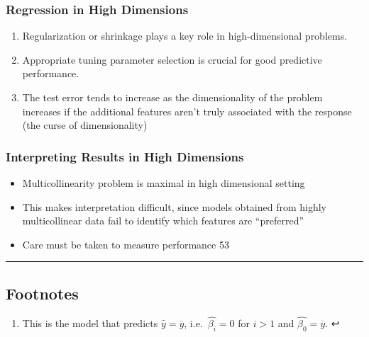 \documentclass[11pt]{article}
\providecommand{\tightlist}{%
      \setlength{\itemsep}{0pt}\setlength{\parskip}{0pt}}
\begin{document}
    \hypertarget{regression-in-high-dimensions}{%
\subsubsection{Regression in High
Dimensions}\label{regression-in-high-dimensions}}

    \begin{enumerate}
\def\labelenumi{\arabic{enumi}.}
\tightlist
\item
  Regularization or shrinkage plays a key role in high-dimensional
  problems.
\item
  Appropriate tuning parameter selection is crucial for good predictive
  performance.
\item
  The test error tends to increase as the dimensionality of the problem
  increases if the additional features aren't truly associated with the
  response (the curse of dimensionality)
\end{enumerate}

    \hypertarget{interpreting-results-in-high-dimensions}{%
\subsubsection{Interpreting Results in High
Dimensions}\label{interpreting-results-in-high-dimensions}}

    \begin{itemize}
\item
  Multicollinearity problem is maximal in high dimensional setting
\item
  This makes interpretation difficult, since models obtained from highly
  multicollinear data fail to identify which features are ``preferred''
\item
  Care must be taken to measure performance 53
\end{itemize}

    \begin{center}\rule{0.5\linewidth}{\linethickness}\end{center}

\hypertarget{footnotes}{%
\subsection{Footnotes}\label{footnotes}}

    \hypertarget{foot35}{}
\begin{enumerate}
\def\labelenumi{\arabic{enumi}.}
\setcounter{enumi}{34}
\tightlist
\item
  This is the model that predicts \(\hat{y} = \overline{y}\),
  i.e.~\(\hat{\beta_i} = 0\) for \(i > 1\) and
  \(\hat{\beta_0} = \overline{y}\). ↩
\end{enumerate}
\end{document}
